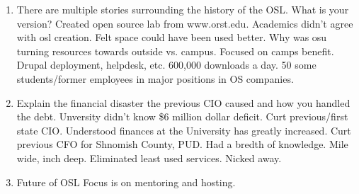 \documentclass[12pt]{article}
\begin{document}
\begin{enumerate}
    \item There are multiple stories surrounding the history of the OSL. What
          is your version?
        Created open source lab from www.orst.edu. Academics didn't agree with osl creation.
        Felt space could have been used better. Why was osu turning resources towards outside vs.
        campus. Focused on camps benefit. Drupal deployment, helpdesk, etc. 600,000 downloads a day.
        50 some students/former employees in major positions in OS companies.
    \item Explain the financial disaster the previous CIO caused and how you handled the debt.
        Unversity didn't know \$6 million dollar deficit. Curt previous/first state CIO. Understood
        finances at the University has greatly increased. Curt previous CFO for Shnomish County, PUD.
        Had a bredth of knowledge. Mile wide, inch deep. Eliminated least used services. Nicked away.
    \item Future of OSL
       Focus is on mentoring and hosting. 
\end{enumerate}
\end{document}
